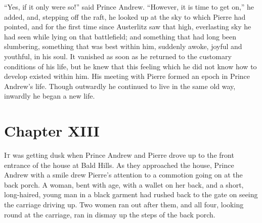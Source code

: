 ``Yes, if it only were so!'' said Prince Andrew. ``However, it is
time to get on,'' he added, and, stepping off the raft, he looked
up at the sky to which Pierre had pointed, and for the first time
since Austerlitz saw that high, everlasting sky he had seen while
lying on that battlefield; and something that had long been
slumbering, something that was best within him, suddenly awoke,
joyful and youthful, in his soul. It vanished as soon as he
returned to the customary conditions of his life, but he knew
that this feeling which he did not know how to develop existed
within him. His meeting with Pierre formed an epoch in Prince
Andrew's life. Though outwardly he continued to live in the same
old way, inwardly he began a new life.


\chapter*{Chapter XIII}
\ifaudio     
{} 
\fi

\lettrine[lines=2, loversize=0.3, lraise=0]{\initfamily I}{t}
was getting dusk when Prince Andrew and Pierre drove up to the
front entrance of the house at Bald Hills. As they approached the
house, Prince Andrew with a smile drew Pierre's attention to a
commotion going on at the back porch. A woman, bent with age,
with a wallet on her back, and a short, long-haired, young man in
a black garment had rushed back to the gate on seeing the
carriage driving up. Two women ran out after them, and all four,
looking round at the carriage, ran in dismay up the steps of the
back porch.

